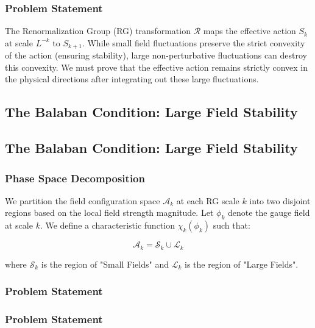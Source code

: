 \subsubsection{Problem Statement}

The Renormalization Group (RG) transformation $\mathcal{R}$ maps the effective action $S_k$ at scale $L^{-k}$ to $S_{k+1}$. While small field fluctuations preserve the strict convexity of the action (ensuring stability), large non-perturbative fluctuations can destroy this convexity. We must prove that the effective action remains strictly convex in the physical directions after integrating out these large fluctuations.

\subsection{The Balaban Condition: Large Field Stability}\subsection{The Balaban Condition: Large Field Stability}

\subsubsection{Phase Space Decomposition}

We partition the field configuration space $\mathcal{A}_k$ at each RG scale $k$ into two disjoint regions based on the local field strength magnitude. Let $\phi_k$ denote the gauge field at scale $k$. We define a characteristic function $\chi_k(\phi_k)$ such that:\label{subsec:balaban_condition}\label{subsec:balaban_condition}

\begin{equation}

    \mathcal{A}_k = \mathcal{S}_k \cup \mathcal{L}_k

\end{equation}

where $\mathcal{S}_k$ is the region of "Small Fields" and $\mathcal{L}_k$ is the region of "Large Fields".\subsubsection{Problem Statement}\subsubsection{Problem Statement}

